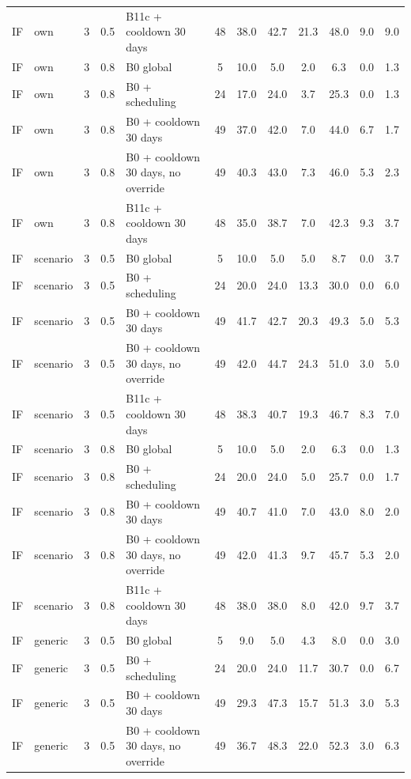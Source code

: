 \begin{longtable}{lllllccccccc}
IF & own & 3 & 0.5 & B11c + cooldown 30 days & 48 & 38.0 & 42.7 & 21.3 & 48.0 & 9.0 & 9.0 \\
IF & own & 3 & 0.8 & B0 global & 5 & 10.0 & 5.0 & 2.0 & 6.3 & 0.0 & 1.3 \\
IF & own & 3 & 0.8 & B0 + scheduling & 24 & 17.0 & 24.0 & 3.7 & 25.3 & 0.0 & 1.3 \\
IF & own & 3 & 0.8 & B0 + cooldown 30 days & 49 & 37.0 & 42.0 & 7.0 & 44.0 & 6.7 & 1.7 \\
IF & own & 3 & 0.8 & B0 + cooldown 30 days, no override & 49 & 40.3 & 43.0 & 7.3 & 46.0 & 5.3 & 2.3 \\
IF & own & 3 & 0.8 & B11c + cooldown 30 days & 48 & 35.0 & 38.7 & 7.0 & 42.3 & 9.3 & 3.7 \\
IF & scenario & 3 & 0.5 & B0 global & 5 & 10.0 & 5.0 & 5.0 & 8.7 & 0.0 & 3.7 \\
IF & scenario & 3 & 0.5 & B0 + scheduling & 24 & 20.0 & 24.0 & 13.3 & 30.0 & 0.0 & 6.0 \\
IF & scenario & 3 & 0.5 & B0 + cooldown 30 days & 49 & 41.7 & 42.7 & 20.3 & 49.3 & 5.0 & 5.3 \\
IF & scenario & 3 & 0.5 & B0 + cooldown 30 days, no override & 49 & 42.0 & 44.7 & 24.3 & 51.0 & 3.0 & 5.0 \\
IF & scenario & 3 & 0.5 & B11c + cooldown 30 days & 48 & 38.3 & 40.7 & 19.3 & 46.7 & 8.3 & 7.0 \\
IF & scenario & 3 & 0.8 & B0 global & 5 & 10.0 & 5.0 & 2.0 & 6.3 & 0.0 & 1.3 \\
IF & scenario & 3 & 0.8 & B0 + scheduling & 24 & 20.0 & 24.0 & 5.0 & 25.7 & 0.0 & 1.7 \\
IF & scenario & 3 & 0.8 & B0 + cooldown 30 days & 49 & 40.7 & 41.0 & 7.0 & 43.0 & 8.0 & 2.0 \\
IF & scenario & 3 & 0.8 & B0 + cooldown 30 days, no override & 49 & 42.0 & 41.3 & 9.7 & 45.7 & 5.3 & 2.0 \\
IF & scenario & 3 & 0.8 & B11c + cooldown 30 days & 48 & 38.0 & 38.0 & 8.0 & 42.0 & 9.7 & 3.7 \\
IF & generic & 3 & 0.5 & B0 global & 5 & 9.0 & 5.0 & 4.3 & 8.0 & 0.0 & 3.0 \\
IF & generic & 3 & 0.5 & B0 + scheduling & 24 & 20.0 & 24.0 & 11.7 & 30.7 & 0.0 & 6.7 \\
IF & generic & 3 & 0.5 & B0 + cooldown 30 days & 49 & 29.3 & 47.3 & 15.7 & 51.3 & 3.0 & 5.3 \\
IF & generic & 3 & 0.5 & B0 + cooldown 30 days, no override & 49 & 36.7 & 48.3 & 22.0 & 52.3 & 3.0 & 6.3 \\

\end{longtable}
